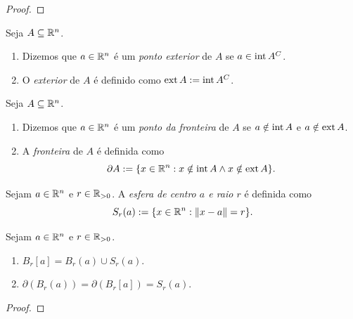 \begin{proof}
    \blackproof
\end{proof}

\begin{definition}
    Seja $A \subseteq \mathbb{R}^n$.
        \begin{enumerate}[leftmargin=*, align=left, label=\textbf{(\alph*)}]
            \item Dizemos que $a \in \mathbb{R}^n$ é um \emph{ponto exterior} de $A$ se $a \in \operatorname{int}{A^C}$.
            \item O \emph{exterior} de $A$ é definido como $\operatorname{ext}{A} := \operatorname{int}{A^C}$.
        \end{enumerate}
\end{definition}

\begin{definition}
    Seja $A \subseteq \mathbb{R}^n$.
        \begin{enumerate}[leftmargin=*, align=left, label=\textbf{(\alph*)}]
            \item Dizemos que $a \in \mathbb{R}^n$ é um \emph{ponto da fronteira} de $A$ se $a \notin \operatorname{int}{A}$ e $a \notin \operatorname{ext}{A}$.
            \item A \emph{fronteira} de $A$ é definida como
                \[
                    \partial A := \{ x \in \mathbb{R}^n : x \notin \operatorname{int}{A} \land x \notin \operatorname{ext}{A} \}.
                \]
        \end{enumerate}
\end{definition}

\begin{definition}
    Sejam $a \in \mathbb{R}^n$ e $r \in \mathbb{R}_{>0}$. A \emph{esfera de centro $a$ e raio $r$} é definida como
        \[
            S_r(a) := \{x \in \mathbb{R}^n : \|x-a\| = r\}.
        \]
\end{definition}

\begin{proposition}
    Sejam $a \in \mathbb{R}^n$ e $r \in \mathbb{R}_{>0}$.
        \begin{enumerate}[leftmargin=*, align=left, label=\textbf{(\alph*)}]
            \item $B_r[a] = B_r(a) \cup S_r(a)$.
            \item $\partial (B_r(a)) = \partial (B_r[a]) = S_r(a)$.
        \end{enumerate}
\end{proposition}

\begin{proof}
    \blackproof
\end{proof}

